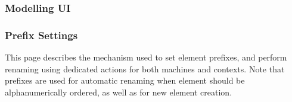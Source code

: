 \subsubsection{Modelling UI}

\subsubsection{Prefix Settings}

This page describes the mechanism used to set element prefixes, and perform renaming using dedicated actions for both machines and contexts. Note that prefixes are used for automatic renaming when element should be alphanumerically ordered, as well as for new element creation. 






